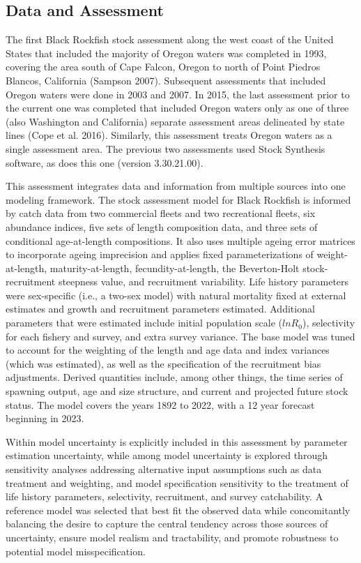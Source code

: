\documentclass[11pt,
  english,
  letterpaper,
]{article}
\begin{document}
\hypertarget{data-and-assessment}{%
\subsection*{Data and Assessment}\label{data-and-assessment}}

The first Black Rockfish stock assessment along the west coast of the United States that included the majority of Oregon waters was completed in 1993, covering the area south of Cape Falcon, Oregon to north of Point Piedros Blancos, California (Sampson 2007). Subsequent assessments that included Oregon waters were done in 2003 and 2007. In 2015, the last assessment prior to the current one was completed that included Oregon waters only as one of three (also Washington and California) separate assessment areas delineated by state lines (Cope et al. 2016). Similarly, this assessment treats Oregon waters as a single assessment area. The previous two assessments used Stock Synthesis software, as does this one (version 3.30.21.00).

This assessment integrates data and information from multiple sources into one modeling framework. The stock assessment model for Black Rockfish is informed by catch data from two commercial fleets and two recreational fleets, six abundance indices, five sets of length composition data, and three sets of conditional age-at-length compositions. It also uses multiple ageing error matrices to incorporate ageing imprecision and applies fixed parameterizations of weight-at-length, maturity-at-length, fecundity-at-length, the Beverton-Holt stock-recruitment steepness value, and recruitment variability. Life history parameters were sex-specific (i.e., a two-sex model) with natural mortality fixed at external estimates and growth and recruitment parameters estimated. Additional parameters that were estimated include initial population scale (\(lnR_0\)), selectivity for each fishery and survey, and extra survey variance. The base model was tuned to account for the weighting of the length and age data and index variances (which was estimated), as well as the specification of the recruitment bias adjustments. Derived quantities include, among other things, the time series of spawning output, age and size structure, and current and projected future stock status. The model covers the years 1892 to 2022, with a 12 year forecast beginning in 2023.

Within model uncertainty is explicitly included in this assessment by parameter estimation uncertainty, while among model uncertainty is explored through sensitivity analyses addressing alternative input assumptions such as data treatment and weighting, and model specification sensitivity to the treatment of life history parameters, selectivity, recruitment, and survey catchability. A reference model was selected that best fit the observed data while concomitantly balancing the desire to capture the central tendency across those sources of uncertainty, ensure model realism and tractability, and promote robustness to potential model misspecification.
\end{document}
